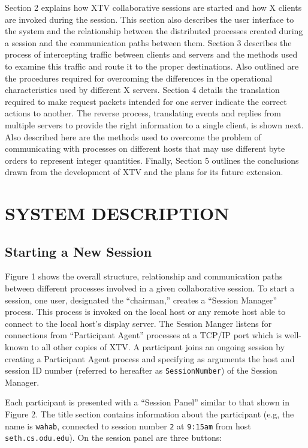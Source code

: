 Section 2 explains how XTV collaborative sessions are started and how X
clients are invoked during the session.  This section also describes
the user interface to the system and the relationship between the
distributed processes created during a session and the communication
paths between them.  Section 3 describes the process of intercepting
traffic between clients and servers and the methods used to examine
this traffic and route it to the proper destinations.  Also outlined
are the procedures required for overcoming the differences in the
operational characteristics used by different X servers.  Section 4
details the translation required to make request packets intended for
one server indicate the correct actions to another.  The reverse
process, translating events and replies from multiple servers to provide the right
information to a single client, is shown next.  Also described here are
the methods used to overcome the problem of communicating with
processes on different hosts that may use different byte orders to
represent integer quantities.  Finally, Section 5 outlines the
conclusions drawn from the development of XTV and the plans for its
future extension.

%
%
\section{SYSTEM DESCRIPTION}
\subsection{Starting a New Session}

Figure 1 shows the overall structure, relationship and communication
paths between different processes involved in a given collaborative
session.  
To start a session, one
user, designated the ``chairman,'' creates a ``Session Manager''
process.  This process is invoked on the local host or any remote host
able to connect to the local host's display server.  The Session Manger
listens for connections from ``Participant Agent'' processes at a
TCP/IP port which is well-known to all other copies of XTV.  A
participant joins an ongoing session by creating a Participant Agent
process and specifying as arguments the host and session ID number
(referred to hereafter as {\tt SessionNumber}) of the Session Manager.

Each participant is presented with a ``Session Panel'' similar to that
shown in Figure 2.  The title section contains information about the
participant (e.g, the name is {\tt wahab}, connected to 
session number {\tt 2} at {\tt 9:15am} from host {\tt seth.cs.odu.edu}).  On the
session panel are three buttons:

